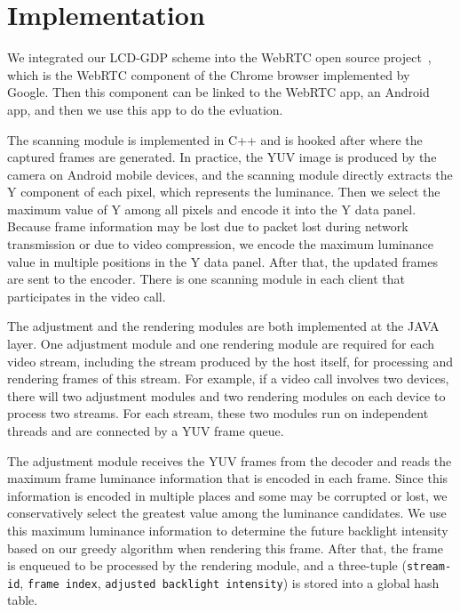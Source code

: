 \section{Implementation}
\label{sec:implementation}



We integrated our LCD-GDP scheme into the WebRTC open source
project~\cite{webrtcproject}, which is the WebRTC component of
the Chrome browser implemented by Google. Then this component can be
linked to the WebRTC app, an Android app, and then we use this app to
do the evluation. 

The scanning module is implemented in C++ and is hooked after where
the captured frames are generated.  In practice, the YUV image is
produced by the camera on Android mobile devices, and the scanning
module directly extracts the Y component of each pixel, which
represents the luminance. Then we select the maximum value of Y among
all pixels and encode it into the Y data panel.  Because frame
information may be lost due to packet lost during network transmission
or due to video compression, we encode the maximum luminance value in
multiple positions in the Y data panel.  After that, the updated
frames are sent to the encoder. There is one scanning module in each
client that participates in the video call.

The adjustment and the rendering modules are both implemented at the
JAVA layer.  One adjustment module and one rendering module are
required for each video stream, including the stream produced by the
host itself, for processing and rendering frames of this stream.  For
example, if a video call involves two devices, there will two
adjustment modules and two rendering modules on each device to process
two streams.  For each stream, these two modules run on independent
threads and are connected by a YUV frame queue.

The adjustment module receives the YUV frames from the decoder and 
reads the maximum frame luminance information that is encoded in each frame.
Since this information is encoded in multiple places and some may be
corrupted or lost,
we conservatively select the greatest value among the luminance candidates.
We use this maximum luminance information to determine the future backlight intensity 
based on our greedy algorithm when rendering this frame.
After that, the frame is enqueued to be processed by the rendering module, 
and a three-tuple ({\tt stream-id}, {\tt frame index}, 
{\tt adjusted backlight intensity}) is stored into a global hash
table. 

